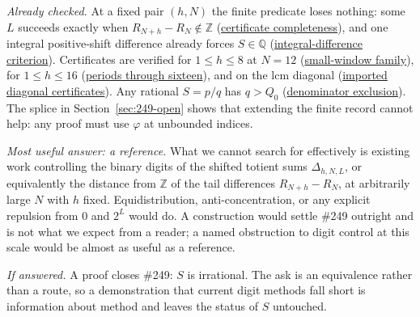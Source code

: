 \documentclass[11pt]{article}
\newcommand{\commit}{99f4bf47422abbd8757cbb22b50ba079d764d3a7}
\newcommand{\repobase}{https://github.com/wcook04/plectis-erdos/blob/\commit}
\newcommand{\PK}{Erdos249257}
\newcommand{\lword}[4]{\href{\repobase/\PK/#1\#L#2}{#4}}
\theoremstyle{definition}
\theoremstyle{remark}
\newcommand{\Z}{\mathbb{Z}}
\newcommand{\Q}{\mathbb{Q}}
\newcommand{\ph}{\varphi}
\newcommand{\Qzero}{Q_0}
\begin{document}
\emph{Already checked.}  At a fixed pair \((h,N)\) the finite predicate loses
nothing: some \(L\) succeeds exactly when \(R_{N+h}-R_N\notin\Z\)
(\lword{LcmConeFlatness.lean}{316}{exists_certifiedKill_iff_tail_diff_notMem_int}{certificate completeness}),
and one integral positive-shift difference already forces \(S\in\Q\)
(\lword{LcmConeFlatness.lean}{357}{not_irrational_of_tail_diff_mem_int}{integral-difference criterion}).
Certificates are verified for \(1\le h\le8\) at \(N=12\)
(\lword{TotientTailPeriodKiller.lean}{404}{certifiedKill_all_small}{small-window family}),
for \(1\le h\le16\)
(\lword{CarrySurvivorExtinction.lean}{574}{certifiedKill_all_upto_sixteen}{periods through sixteen}),
and on the lcm diagonal
(\lword{DiagonalPincerCertificatesT64.lean}{1967}{certifiedKill_diagonal_all_imported_through_t64}{imported diagonal certificates}).
Any rational \(S=p/q\) has \(q>\Qzero\)
(\lword{CertificateKernel.lean}{18384}{tsum_totient_div_pow_two_ne_ratCast_of_den_le_79639646646701375323355774875831053}{denominator exclusion}).
The splice in Section~\ref{sec:249-open} shows that extending the finite
record cannot help: any proof must use \(\ph\) at unbounded indices.

\emph{Most useful answer: a reference.}  What we cannot search for
effectively is existing work controlling the binary digits of the shifted
totient sums \(\Delta_{h,N,L}\), or equivalently the distance from \(\Z\) of
the tail differences \(R_{N+h}-R_N\), at arbitrarily large \(N\) with \(h\)
fixed.  Equidistribution, anti-concentration, or any explicit repulsion from
\(0\) and \(2^L\) would do.  A construction would settle \#249 outright and
is not what we expect from a reader; a named obstruction to digit control at
this scale would be almost as useful as a reference.

\emph{If answered.}  A proof closes \#249: \(S\) is irrational.  The ask is
an equivalence rather than a route, so a demonstration that current digit
methods fall short is information about method and leaves the status of
\(S\) untouched.
\end{document}
